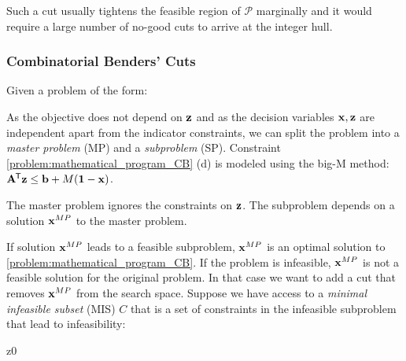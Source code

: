 Such a cut usually tightens the feasible region of $\mathcal{P}$ marginally and it would require a large number of no-good cuts to arrive at the integer hull.

\subsubsection{Combinatorial Benders' Cuts}
Given a problem of the form:
As the objective does not depend on $\bold z$ and as the decision variables $\bold x, \bold z$ are independent apart from the indicator constraints, we can split the problem into a \textit{master problem} (MP) and a \textit{subproblem} (SP). Constraint \cref{problem:mathematical_program_CB} (d) is modeled using the big-M method: $\bold A ^{\mkern-1.5mu\mathsf{T}} \bold z \leq \bold b + M(\bold 1- \bold x)$.
The master problem ignores the constraints on $\bold z$. The subproblem depends on a solution $\bold x^{MP}$ to the master problem. 

If solution $\bold x^{MP}$ leads to a feasible subproblem, $\bold x^{MP}$ is an optimal solution to \cref{problem:mathematical_program_CB}. If the problem is infeasible, $\bold x^{MP}$ is not a feasible solution for the original problem. In that case we want to add a cut that removes $\bold x^{MP}$ from the search space. Suppose we have access to a \textit{minimal infeasible subset} (MIS) $C$ that is a set of constraints in the infeasible subproblem that lead to infeasibility: 
\begin{mini!}
    {\scriptstyle \bold z}{0}{}{}
\end{mini!}

